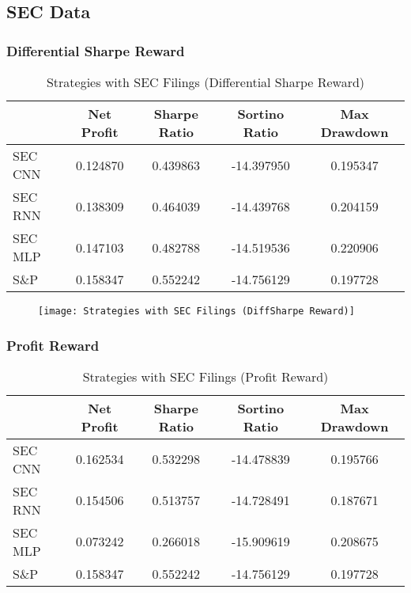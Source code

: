 \subsection{SEC Data}

\subsubsection{Differential Sharpe Reward}

\begin{table}[htbp]
    \centering
    \caption{Strategies with SEC Filings (Differential Sharpe Reward)}
      \begin{tabular}{lcccc}
      \toprule
            & Net Profit & Sharpe Ratio & Sortino Ratio & Max Drawdown \\
      \midrule
      SEC CNN & 0.124870 & 0.439863 & -14.397950 & 0.195347 \\
      SEC RNN & 0.138309 & 0.464039 & -14.439768 & 0.204159 \\
      SEC MLP & 0.147103 & 0.482788 & -14.519536 & 0.220906 \\
      S\&P   & 0.158347 & 0.552242 & -14.756129 & 0.197728 \\
      \bottomrule
      \end{tabular}%
    \label{tab:addlabel}%
  \end{table}%

\begin{center}
    \begin{figure}
    \texttt{[image: Strategies with SEC Filings (DiffSharpe Reward)]}
    \end{figure}
\end{center}

\subsubsection{Profit Reward}

\begin{table}[htbp]
    \centering
    \caption{Strategies with SEC Filings (Profit Reward)}
      \begin{tabular}{lcccc}
      \toprule
            & Net Profit & Sharpe Ratio & Sortino Ratio & Max Drawdown \\
      \midrule
      SEC CNN & 0.162534 & 0.532298 & -14.478839 & 0.195766 \\
      SEC RNN & 0.154506 & 0.513757 & -14.728491 & 0.187671 \\
      SEC MLP & 0.073242 & 0.266018 & -15.909619 & 0.208675 \\
      S\&P   & 0.158347 & 0.552242 & -14.756129 & 0.197728 \\
      \bottomrule
      \end{tabular}%
    \label{tab:sec_profit}%
  \end{table}%

